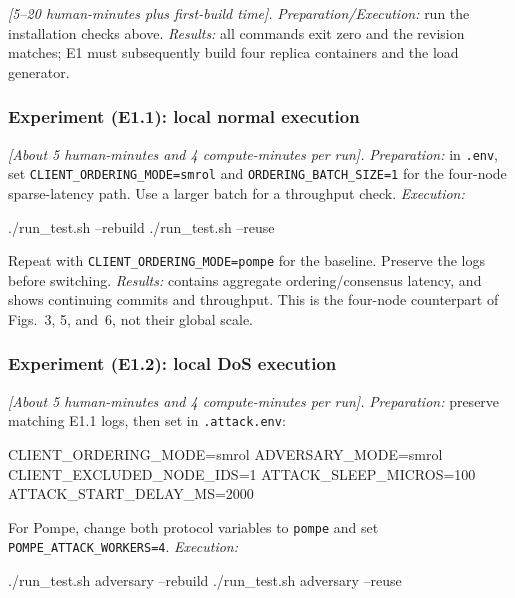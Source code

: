 \documentclass[conference]{IEEEtran}
\begin{document}
\textit{[5--20 human-minutes plus first-build time].}
\textit{Preparation/Execution:} run the installation checks above.
\textit{Results:} all commands exit zero and the revision matches; E1 must
subsequently build four replica containers and the load generator.

\subsubsection{Experiment (E1.1): local normal execution}

\textit{[About 5 human-minutes and 4 compute-minutes per run].}
\textit{Preparation:} in \texttt{.env}, set
\texttt{CLIENT\_ORDERING\_MODE=smrol} and
\texttt{ORDERING\_BATCH\_SIZE=1} for the four-node sparse-latency path.
Use a larger batch for a throughput check.  \textit{Execution:}

\begin{commandbox}
./run_test.sh --rebuild
./run_test.sh --reuse
\end{commandbox}

Repeat with \texttt{CLIENT\_ORDERING\_MODE=pompe} for the baseline.  Preserve
the logs before switching.  \textit{Results:}  contains
aggregate ordering/consensus latency, and
 shows continuing commits and throughput.
This is the four-node counterpart of Figs.~3, 5, and~6, not their global scale.

\subsubsection{Experiment (E1.2): local DoS execution}

\textit{[About 5 human-minutes and 4 compute-minutes per run].}
\textit{Preparation:} preserve matching E1.1 logs, then set in
\texttt{.attack.env}:

\begin{commandbox}
CLIENT_ORDERING_MODE=smrol
ADVERSARY_MODE=smrol
CLIENT_EXCLUDED_NODE_IDS=1
ATTACK_SLEEP_MICROS=100
ATTACK_START_DELAY_MS=2000
\end{commandbox}

For Pompe, change both protocol variables to \texttt{pompe} and set
\texttt{POMPE\_ATTACK\_WORKERS=4}.  \textit{Execution:}

\begin{commandbox}
./run_test.sh adversary --rebuild
./run_test.sh adversary --reuse
\end{commandbox}
\end{document}
